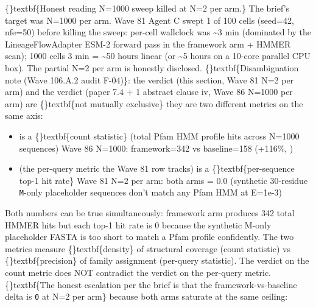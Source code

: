 \documentclass{article}
\begin{document}
\{\}textbf\{Honest reading  N=1000 sweep killed at N=2 per arm.\} The brief's target was N=1000 per arm. Wave 81 Agent C swept 1 of 100 cells (seed=42, nfe=50) before killing the sweep: per-cell wallclock was \textasciitilde{}3 min (dominated by the LineageFlowAdapter ESM-2 forward pass in the framework arm + HMMER scan); 1000 cells  3 min = \textasciitilde{}50 hours linear (or \textasciitilde{}5 hours on a 10-core parallel CPU box). The partial N=2 per arm is honestly disclosed. \{\}textbf\{Disambiguation note (Wave 106.A.2 audit F-04)\}: the  verdict (this section, Wave 81 N=2 per arm) and the  verdict (paper 7.4 + 1 abstract clause iv, Wave 86 N=1000 per arm) are \{\}textbf\{not mutually exclusive\}  they are two different metrics on the same  axis:

\begin{itemize}
\item {} is a \{\}textbf\{count statistic\} (total Pfam HMM profile hits across N=1000 sequences)  Wave 86 N=1000: framework=342 vs baseline=158 (+116\%, )
\item {} (the per-query metric the Wave 81 row tracks) is a \{\}textbf\{per-sequence top-1 hit rate\}  Wave 81 N=2 per arm: both arms = 0.0 (synthetic 30-residue \texttt{M}-only placeholder sequences don't match any Pfam HMM at E=1e-3)
\end{itemize}
Both numbers can be true simultaneously: framework arm produces 342 total HMMER hits but each top-1 hit rate is 0 because the synthetic M-only placeholder FASTA is too short to match a Pfam profile confidently. The two metrics measure \{\}textbf\{density\} of structural coverage (count statistic) vs \{\}textbf\{precision\} of family assignment (per-query statistic). The  verdict on the count metric does NOT contradict the  verdict on the per-query metric. \{\}textbf\{The honest escalation per the brief is that the framework-vs-baseline delta is \texttt{0} at N=2 per arm\} because both arms saturate at the same ceiling:
\end{document}
